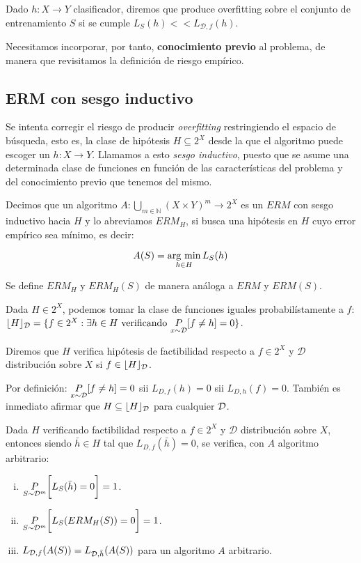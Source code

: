 \begin{definition}[Overfitting]

 Dado $h: X\rightarrow Y$ clasificador, diremos que produce overfitting sobre el conjunto de entrenamiento 
 $S$ si se cumple $L_S(h) << L_{\mathcal{D},f}(h)$.
\end{definition}

Necesitamos incorporar, por tanto, \textbf{conocimiento previo} al problema, de manera que revisitamos la definición de riesgo
empírico.

\subsection{ERM con sesgo inductivo}
Se intenta corregir el riesgo de producir \emph{overfitting} restringiendo el espacio de búsqueda, esto es, la clase de 
hipótesis $H \subseteq 2^X$ desde la que el algoritmo puede escoger un $h: X\rightarrow Y$. Llamamos a esto 
\emph{sesgo inductivo}, puesto que se asume una determinada clase de funciones en función de las 
características del problema y del conocimiento previo que tenemos del mismo.

\begin{definition}
Decimos que un algoritmo $A: \underset{m\in \mathbb{N}}{\bigcup} (X\times Y)^m \rightarrow 2^{X}$ es un $ERM$ con sesgo 
inductivo hacia $H$ y lo abreviamos $ERM_H$, si busca una hipótesis en $H$ cuyo error empírico 
sea mínimo, es decir:

\[A(S) = \operatorname*{arg\,\min}_{h\in H} L_S(h)\]
\end{definition}

Se define $ERM_H$ y $ERM_H(S)$ de manera análoga a $ERM$ y $ERM(S)$.

Dada $H\in 2^X$, podemos tomar la clase de funciones iguales probabilístamente a $f$:
$\lfloor H \rfloor_{\mathcal{D}} = \{f\in 2^X: \exists h\in H \textrm{ verificando }\underset{x\sim \mathcal{D}}{P}[f\neq h] = 0\}$.

\begin{definition}

Diremos que $H$ verifica hipótesis de factibilidad respecto a $f\in 2^X$ y $\mathcal{D}$ distribución sobre 
$X$ si $f\in \lfloor H \rfloor_{\mathcal{D}}$. 
\end{definition}

Por definición: $\underset{x\sim \mathcal{D}}{P}[f\neq h]=0$ sii $L_{D,f}(h) = 0$ sii $L_{D,h}(f) = 0$. También es inmediato afirmar que
$H \subseteq \lfloor H \rfloor_{\mathcal{D}}$ para cualquier $\mathcal{D}$.

\begin{fact}
Dada $H$ verificando factibilidad respecto a $f\in 2^X$ y $\mathcal{D}$ distribución sobre $X$, entonces siendo 
${\bar{h}} \in H$ tal que $L_{D,f}(\bar{h}) = 0$, se verifica, con $A$ algoritmo arbitrario:
\begin{enumerate}[i.]
\item $\underset{S\sim \mathcal{D}^m}{P} \bigg[L_S(\bar{h}) = 0 \bigg] = 1$.
\item $\underset{S\sim \mathcal{D}^m}{P} \bigg[L_S(ERM_H(S)) = 0 \bigg] = 1$.
\item $L_{\mathcal{D},f}(A(S)) = L_{\mathcal{D},\bar{h}}(A(S))$ para un algoritmo $A$ arbitrario.
\end{enumerate}
\label{fact:factibilidad}
\end{fact}

